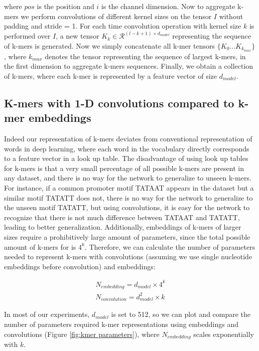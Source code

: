 \documentclass{article}
\begin{document}
where $pos$ is the position and $i$ is the channel dimension. Now to aggregate k-mers we perform convolutions of different kernel sizes on the tensor $I$ without padding and stride = 1. For each time convolution operation with kernel size $k$ is performed over $I$, a new tensor $K_k \in \mathcal{R}^{(l-k+1)\times d_{model}}$ representing the sequence of k-mers is generated. Now we simply concatenate all k-mer tensors $\{K_0...K_{k_{max}}\}$, where $k_{max}$ denotes the tensor representing the sequence of largest k-mers, in the first dimension to aggregate k-mers sequences. Finally, we obtain a collection of k-mers, where each k-mer is represented by a feature vector of size $d_{model}$.


\subsection{K-mers with 1-D convolutions compared to k-mer embeddings}
Indeed our representation of k-mers deviates from conventional representation of words in deep learning, where each word in the vocabulary directly corresponds to a feature vector in a look up table. The disadvantage of using look up tables for k-mers is that a very small percentage of all possible k-mers are present in any dataset, and there is no way for the network to generalize to unseen k-mers. For instance, if a common promoter motif TATAAT appears in the dataset but a similar motif TATATT does not, there is no way for the network to generalize to the unseen motif TATATT, but using convolutions, it is easy for the network to recognize that there is not much difference between TATAAT and TATATT, leading to better generalization. Additionally,  embeddings of k-mers of larger sizes require a prohibitively large amount of parameters, since the total possible amount of k-mers for is $4^k$. Therefore, we can calculate the number of parameters needed to represent k-mers with convolutions (assuming we use single nucleotide embeddings before convolution) and embeddings:

\begin{align}
N_{embedding}=d_{model}\times4^k \\
N_{convolution}=d_{model}^2\times k
\end{align} 

In most of our experiments, $d_{model}$ is set to 512, so we can plot and compare the number of parameters required k-mer representations using embeddings and convolutions (Figure \ref{fig:kmer parameters}), where $N_{embedding}$ scales exponentially with $k$. 
\end{document}

